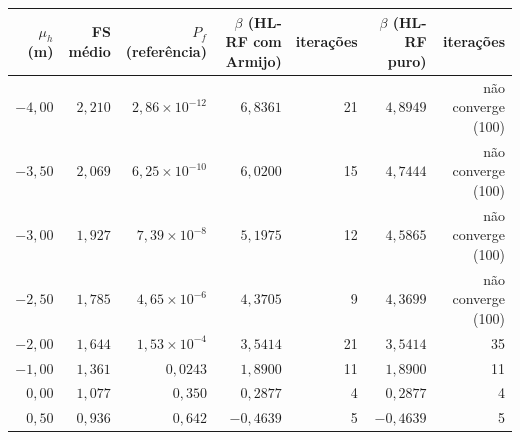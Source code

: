 \begin{tabular}{@{}r r r r r r r@{}}
\toprule
$\mu_h$ (m) & FS médio & $P_f$ (referência) & $\beta$ (HL-RF com Armijo) & iterações & $\beta$ (HL-RF puro) & iterações \\
\midrule
$-4{,}00$ & $2{,}210$ & $2{,}86\times 10^{-12}$ & $6{,}8361$ & 21 & $4{,}8949$ & não converge (100) \\
$-3{,}50$ & $2{,}069$ & $6{,}25\times 10^{-10}$ & $6{,}0200$ & 15 & $4{,}7444$ & não converge (100) \\
$-3{,}00$ & $1{,}927$ & $7{,}39\times 10^{-8}$ & $5{,}1975$ & 12 & $4{,}5865$ & não converge (100) \\
$-2{,}50$ & $1{,}785$ & $4{,}65\times 10^{-6}$ & $4{,}3705$ & 9 & $4{,}3699$ & não converge (100) \\
$-2{,}00$ & $1{,}644$ & $1{,}53\times 10^{-4}$ & $3{,}5414$ & 21 & $3{,}5414$ & 35 \\
$-1{,}00$ & $1{,}361$ & $0{,}0243$ & $1{,}8900$ & 11 & $1{,}8900$ & 11 \\
$0{,}00$ & $1{,}077$ & $0{,}350$ & $0{,}2877$ & 4 & $0{,}2877$ & 4 \\
$0{,}50$ & $0{,}936$ & $0{,}642$ & $-0{,}4639$ & 5 & $-0{,}4639$ & 5 \\
\bottomrule
\end{tabular}
